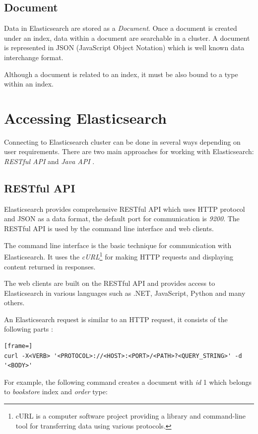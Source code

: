 \documentclass[12pt,oneside]{fithesis2}
\begin{document}
\subsection{Document}
Data in Elasticsearch are stored as a \textit{Document}. Once a document is created under an index, data within a document are searchable in a cluster. A document is represented in JSON (JavaScript Object Notation) which is well known data interchange format.

Although a document is related to an index, it must be also bound to a type within an index.

\section{Accessing Elasticsearch}
Connecting to Elasticsearch cluster can be done in several ways depending on user requirements. There are two main approaches for working with Elasticsearch: \textit{RESTful API} and \textit{Java API} \cite[Talking to Elasticsearch]{elasticsearch_defnitive_guide}.

\subsection{RESTful API}
Elasticsearch provides comprehensive RESTful API which uses HTTP protocol and JSON as a data format, the default port for communication is \textit{9200}. The RESTful API is used by the command line interface and web clients.

The command line interface is the basic technique for communication with Elasticsearch. It uses the \textit{cURL}\footnote{cURL is a computer software project providing a library and command-line tool for transferring data using various protocols.} for making HTTP requests and displaying content returned in responses.

The web clients are built on the RESTful API and provides access to Elasticsearch in various languages such as .NET, JavaScript, Python and many others.

An Elasticsearch request is similar to an HTTP request, it consists of the following parts \cite[Talking to Elasticsearch]{elasticsearch_defnitive_guide}:

\begin{lstlisting}[frame=]
curl -X<VERB> '<PROTOCOL>://<HOST>:<PORT>/<PATH>?<QUERY_STRING>' -d '<BODY>'
\end{lstlisting}

For example, the following command creates a document with \textit{id} 1 which belongs to \textit{bookstore} index and \textit{order} type:
\end{document}
